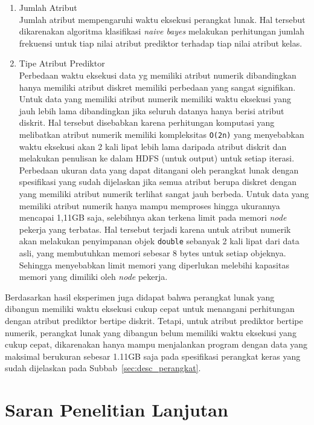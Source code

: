 \begin{itemize}
\begin{enumerate}[label=(\alph*)]
		\item Jumlah Atribut\\
		Jumlah atribut mempengaruhi waktu eksekusi perangkat lunak. Hal tersebut dikarenakan algoritma klasifikasi \textit{naive bayes} melakukan perhitungan jumlah frekuensi untuk tiap nilai atribut prediktor terhadap tiap nilai atribut kelas.
		
		\item Tipe Atribut Prediktor\\
		Perbedaan waktu eksekusi data yg memiliki atribut numerik dibandingkan hanya memiliki atribut diskret memiliki perbedaan yang sangat signifikan. Untuk data yang memiliki atribut numerik memiliki waktu eksekusi yang jauh lebih lama dibandingkan jika seluruh datanya hanya berisi atribut diskrit. Hal tersebut disebabkan karena perhitungan komputasi yang melibatkan atribut numerik memiliki kompleksitas \verb|O(2n)| yang menyebabkan waktu eksekusi akan 2 kali lipat lebih lama daripada atribut diskrit dan melakukan penulisan ke dalam HDFS (untuk output) untuk setiap iterasi.%
		Perbedaan ukuran data yang dapat ditangani oleh perangkat lunak dengan spesifikasi yang sudah dijelaskan jika semua atribut berupa diskret dengan yang memiliki atribut numerik terlihat sangat jauh berbeda. Untuk data yang memiliki atribut numerik hanya mampu memproses hingga ukurannya mencapai 1,11GB saja, selebihnya akan terkena limit pada memori \textit{node} pekerja yang terbatas. Hal tersebut terjadi karena untuk atribut numerik akan melakukan penyimpanan objek \texttt{double} sebanyak 2 kali lipat dari data asli, yang membutuhkan memori sebesar 8 bytes untuk setiap objeknya. Sehingga menyebabkan limit memori yang diperlukan melebihi kapasitas memori yang dimiliki oleh \textit{node} pekerja.
	\end{enumerate}

	Berdasarkan hasil eksperimen juga didapat bahwa perangkat lunak yang dibangun memiliki waktu eksekusi cukup cepat untuk menangani perhitungan dengan atribut prediktor bertipe diskrit. Tetapi, untuk atribut prediktor bertipe numerik, perangkat lunak yang dibangun belum memiliki waktu eksekusi yang cukup cepat, dikarenakan hanya mampu menjalankan program dengan data yang maksimal berukuran sebesar 1.11GB saja pada spesifikasi perangkat keras yang sudah dijelaskan pada Subbab~\ref{sec:desc_perangkat}.
	
\end{itemize}

\section{Saran Penelitian Lanjutan}

